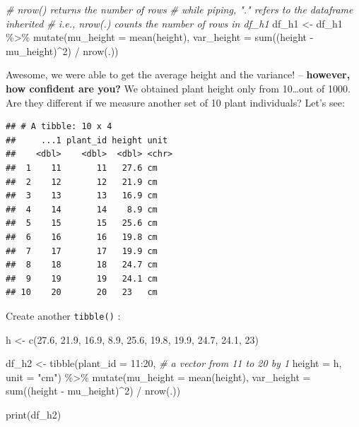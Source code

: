 \documentclass[
]{article}
\newenvironment{Shaded}{\begin{snugshade}}{\end{snugshade}}
\newcommand{\AttributeTok}[1]{\textcolor[rgb]{0.77,0.63,0.00}{#1}}
\newcommand{\CommentTok}[1]{\textcolor[rgb]{0.56,0.35,0.01}{\textit{#1}}}
\newcommand{\DecValTok}[1]{\textcolor[rgb]{0.00,0.00,0.81}{#1}}
\newcommand{\FloatTok}[1]{\textcolor[rgb]{0.00,0.00,0.81}{#1}}
\newcommand{\FunctionTok}[1]{\textcolor[rgb]{0.00,0.00,0.00}{#1}}
\newcommand{\NormalTok}[1]{#1}
\newcommand{\OtherTok}[1]{\textcolor[rgb]{0.56,0.35,0.01}{#1}}
\newcommand{\SpecialCharTok}[1]{\textcolor[rgb]{0.00,0.00,0.00}{#1}}
\newcommand{\StringTok}[1]{\textcolor[rgb]{0.31,0.60,0.02}{#1}}
\begin{document}
\begin{Shaded}
\begin{Highlighting}[]
\CommentTok{\# nrow() returns the number of rows}
\CommentTok{\# while piping, "." refers to the dataframe inherited }
\CommentTok{\# i.e., nrow(.) counts the number of rows in df\_h1}
\NormalTok{df\_h1 }\OtherTok{\textless{}{-}}\NormalTok{ df\_h1 }\SpecialCharTok{\%\textgreater{}\%} 
  \FunctionTok{mutate}\NormalTok{(}\AttributeTok{mu\_height =} \FunctionTok{mean}\NormalTok{(height),}
         \AttributeTok{var\_height =} \FunctionTok{sum}\NormalTok{((height }\SpecialCharTok{{-}}\NormalTok{ mu\_height)}\SpecialCharTok{\^{}}\DecValTok{2}\NormalTok{) }\SpecialCharTok{/} \FunctionTok{nrow}\NormalTok{(.))}
\end{Highlighting}
\end{Shaded}

Awesome, we were able to get the average height and the variance! -- \textbf{however, how confident are you?} We obtained plant height only from 10\ldots out of 1000. Are they different if we measure another set of 10 plant individuals? Let's see:

\begin{verbatim}
## # A tibble: 10 x 4
##     ...1 plant_id height unit 
##    <dbl>    <dbl>  <dbl> <chr>
##  1    11       11   27.6 cm   
##  2    12       12   21.9 cm   
##  3    13       13   16.9 cm   
##  4    14       14    8.9 cm   
##  5    15       15   25.6 cm   
##  6    16       16   19.8 cm   
##  7    17       17   19.9 cm   
##  8    18       18   24.7 cm   
##  9    19       19   24.1 cm   
## 10    20       20   23   cm
\end{verbatim}

Create another \texttt{tibble()} :

\begin{Shaded}
\begin{Highlighting}[]
\NormalTok{h }\OtherTok{\textless{}{-}} \FunctionTok{c}\NormalTok{(}\FloatTok{27.6}\NormalTok{, }\FloatTok{21.9}\NormalTok{, }\FloatTok{16.9}\NormalTok{, }\FloatTok{8.9}\NormalTok{, }\FloatTok{25.6}\NormalTok{, }\FloatTok{19.8}\NormalTok{, }\FloatTok{19.9}\NormalTok{, }\FloatTok{24.7}\NormalTok{, }\FloatTok{24.1}\NormalTok{, }\DecValTok{23}\NormalTok{)}

\NormalTok{df\_h2 }\OtherTok{\textless{}{-}} \FunctionTok{tibble}\NormalTok{(}\AttributeTok{plant\_id =} \DecValTok{11}\SpecialCharTok{:}\DecValTok{20}\NormalTok{, }\CommentTok{\# a vector from 11 to 20 by 1}
                \AttributeTok{height =}\NormalTok{ h,}
                \AttributeTok{unit =} \StringTok{"cm"}\NormalTok{) }\SpecialCharTok{\%\textgreater{}\%} 
  \FunctionTok{mutate}\NormalTok{(}\AttributeTok{mu\_height =} \FunctionTok{mean}\NormalTok{(height),}
         \AttributeTok{var\_height =} \FunctionTok{sum}\NormalTok{((height }\SpecialCharTok{{-}}\NormalTok{ mu\_height)}\SpecialCharTok{\^{}}\DecValTok{2}\NormalTok{) }\SpecialCharTok{/} \FunctionTok{nrow}\NormalTok{(.))}

\FunctionTok{print}\NormalTok{(df\_h2)}
\end{Highlighting}
\end{Shaded}
\end{document}
